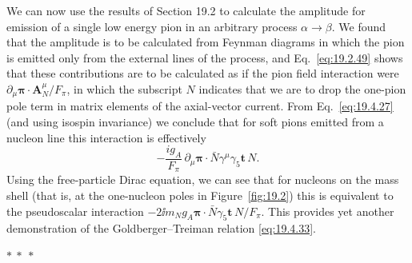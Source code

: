 We can now use the results of Section 19.2 to calculate the amplitude for emission of a single low energy pion in an arbitrary process $\alpha\to\beta$. We found that the amplitude is to be calculated from Feynman diagrams in which the pion is emitted only from the external lines of the process, and Eq.~\eqref{eq:19.2.49} shows that these contributions are to be calculated as if the pion field interaction were $\partial_\mu\boldsymbol{\pi}\cdot\mathbf{A}_N^\mu/F_\pi$, in which the subscript $N$ indicates that we are to drop the one-pion pole term in matrix elements of the axial-vector current. From Eq.~\eqref{eq:19.4.27} (and using isospin invariance) we conclude that for soft pions emitted from a nucleon line this interaction is effectively
\[
-\frac{ig_A}{F_\pi}\,
\partial_\mu\boldsymbol{\pi}\cdot\bar N\gamma^\mu\gamma_5\mathbf{t}\,N.
\]
Using the free-particle Dirac equation, we can see that for nucleons on the mass shell (that is, at the one-nucleon poles in Figure~\ref{fig:19.2}) this is equivalent to the pseudoscalar interaction $-2\ii m_Ng_A\boldsymbol{\pi}\cdot\bar N\gamma_5\mathbf{t}\,N/F_\pi$. This provides yet another demonstration of the Goldberger--Treiman relation \eqref{eq:19.4.33}.

\begin{center}
$* \ * \ *$
\end{center}

